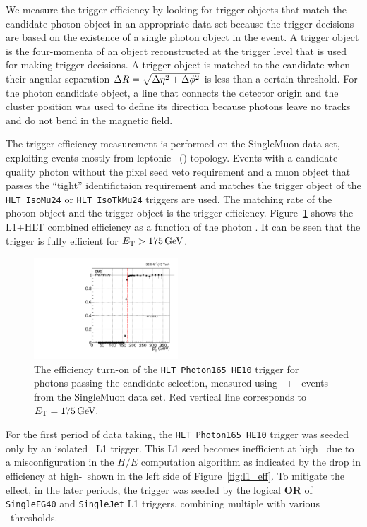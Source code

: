 We measure the trigger efficiency by looking for trigger objects that match the candidate photon object in an appropriate data set because the trigger decisions are based on the existence of a single photon object in the event.
A trigger object is the four-momenta of an object reconstructed at the trigger level that is used for making trigger decisions. 
A trigger object is matched to the candidate when their angular separation  $\Delta R = \sqrt{\Delta \eta^2 + \Delta \phi^2}$ is less than a certain threshold. 
For the photon candidate object, a line that connects the detector origin and the cluster position was used to define its direction because photons leave no tracks and do not bend in the magnetic field.

The trigger efficiency measurement is performed on the SingleMuon data set, exploiting events mostly from leptonic \ttbar\ (\Pe\Pgm) topology. 
Events with a candidate-quality photon without the pixel seed veto requirement and a muon object that passes the ``tight'' identifictaion requirement and matches the trigger object of the \texttt{HLT\_IsoMu24} or \texttt{HLT\_IsoTkMu24} triggers are used. 
The matching rate of the photon object and the trigger object is the trigger efficiency. 
Figure~\ref{fig:hlt_eff} shows the L1+HLT combined efficiency as a function of the photon \ET. 
It can be seen that the trigger is fully efficient for $E_{\mathrm{T}} > 175\,\text{Ge\hspace{-.08em}V}$.

\begin{figure}[htbp]
  \centering
  \includegraphics[width=0.48\textwidth]{Analysis/Figures/trigger/photon_elmu_sph165abs_ptzoom.pdf}
  \caption{
    The efficiency turn-on of the \texttt{HLT\_Photon165\_HE10} trigger for photons passing the candidate selection, measured using \Pgm\ + \egamma\ events from the SingleMuon data set. 
    Red vertical line corresponds to $E_{\mathrm{T}} = 175\,\text{Ge\hspace{-.08em}V}.$
  }
  \label{fig:hlt_eff}
\end{figure}

For the first period of data taking, the \texttt{HLT\_Photon165\_HE10} trigger was seeded only by an isolated \egamma\ L1 trigger. 
This L1 seed becomes inefficient at high \ET\ due to a misconfiguration in the $H/E$ computation algorithm as indicated by the drop in efficiency at high-\ET\ shown in the left side of Figure~\ref{fig:l1_eff}. 
To mitigate the effect, in the later periods, the trigger was seeded by the logical \textbf{OR} of \texttt{SingleEG40} and \texttt{SingleJet} L1 triggers, combining multiple with various \pt\ thresholds.

